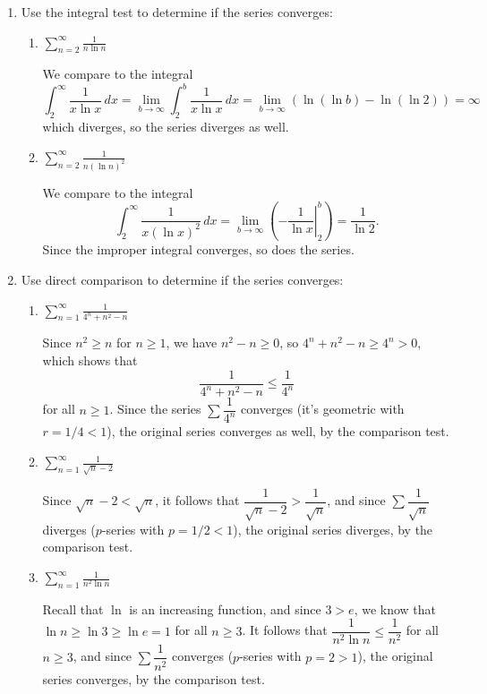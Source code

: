 \documentclass[12pt]{article}
\newcommand{\di}{\displaystyle}
\begin{document}
\begin{enumerate}
\item Use the integral test to determine if the series converges:

 \begin{enumerate}
  \item $\di \sum_{n=2}^\infty\frac{1}{n\ln n}$

\bigskip

We compare to the integral
\[
\int_2^\infty\frac{1}{x\ln x}\,dx = \lim_{b\to\infty}\int_2^b\frac{1}{x\ln x}\,dx = \lim_{b\to\infty}(\ln(\ln b)-\ln(\ln 2)) = \infty
\]
which diverges, so the series diverges as well.

  \item $\di \sum_{n=2}^\infty\frac{1}{n(\ln n)^2}$
  
  \bigskip
  
We compare to the integral
\[
\int_2^\infty \frac{1}{x(\ln x)^2}\,dx = \lim_{b\to \infty}\left(\left.-\frac{1}{\ln x}\right|_2^b\right) = \frac{1}{\ln 2}.
\]
Since the improper integral converges, so does the series.
 \end{enumerate}

\item Use direct comparison to determine if the series converges:

\begin{enumerate}
 \item $\di \sum_{n=1}^\infty \frac{1}{4^n+n^2-n}$
 
 \bigskip
 
 Since $n^2\geq n$ for $n\geq 1$, we have $n^2-n\geq 0$, so $4^n+n^2-n\geq 4^n>0$, which shows that
 \[
 \frac{1}{4^n+n^2-n}\leq \frac{1}{4^n}
 \]
 for all $n\geq 1$. Since the series $\sum \dfrac{1}{4^n}$ converges (it's geometric with $r=1/4<1$), the original series converges as well, by the comparison test.
 
 \item $\di \sum_{n=1}^\infty \frac{1}{\sqrt{n}-2}$

\bigskip

 Since $\sqrt{n}-2<\sqrt{n}$, it follows that $\dfrac{1}{\sqrt{n}-2}>\dfrac{1}{\sqrt{n}}$, and since $\sum \dfrac{1}{\sqrt{n}}$ diverges ($p$-series with $p=1/2<1$), the original series diverges, by the comparison test.
 
 \item $\di \sum_{n=1}^\infty \frac{1}{n^2\ln n}$

\bigskip

 Recall that $\ln$ is an increasing function, and since $3>e$, we know that $\ln n\geq \ln 3\geq \ln e=1$ for all $n\geq 3$. It follows that $\dfrac{1}{n^2\ln n}\leq \dfrac{1}{n^2}$ for all $n\geq 3$, and since $\sum\dfrac{1}{n^2}$ converges ($p$-series with $p=2>1$), the original series converges, by the comparison test.
 

\end{enumerate}
\end{enumerate}
\end{document}
